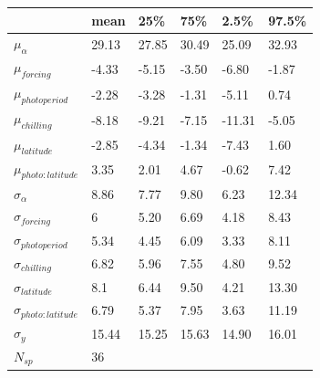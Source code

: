 \documentclass{article}
\begin{document}
\begin{footnotesize}
\begin{table}[ht]
\label{tab:lat}
\begingroup\footnotesize
\begin{tabular}{|p{}|p{}|p{}|p{}|p{}|p{}|}
  \hline
 & mean & 25\% & 75\% & 2.5\% & 97.5\% \\ 
  \hline
$\mu_{\alpha}$ & 29.13 & 27.85 & 30.49 & 25.09 & 32.93 \\ 
  $\mu_{forcing}$ & -4.33 & -5.15 & -3.50 & -6.80 & -1.87 \\ 
  $\mu_{photoperiod}$ & -2.28 & -3.28 & -1.31 & -5.11 & 0.74 \\ 
  $\mu_{chilling}$ & -8.18 & -9.21 & -7.15 & -11.31 & -5.05 \\ 
  $\mu_{latitude}$ & -2.85 & -4.34 & -1.34 & -7.43 & 1.60 \\ 
  $\mu_{photo:latitude}$ & 3.35 & 2.01 & 4.67 & -0.62 & 7.42 \\ 
  $\sigma_{\alpha}$ & 8.86 & 7.77 & 9.80 & 6.23 & 12.34 \\ 
  $\sigma_{forcing}$ & 6 & 5.20 & 6.69 & 4.18 & 8.43 \\ 
  $\sigma_{photoperiod}$ & 5.34 & 4.45 & 6.09 & 3.33 & 8.11 \\ 
  $\sigma_{chilling}$ & 6.82 & 5.96 & 7.55 & 4.80 & 9.52 \\ 
  $\sigma_{latitude}$ & 8.1 & 6.44 & 9.50 & 4.21 & 13.30 \\ 
  $\sigma_{photo:latitude}$ & 6.79 & 5.37 & 7.95 & 3.63 & 11.19 \\ 
  $\sigma_{y}$ & 15.44 & 15.25 & 15.63 & 14.90 & 16.01 \\ 
   \hline
$N_{sp}$ & 36 &  &  &  &  \\ 
   \hline
\end{tabular}
\endgroup
\end{table}


\end{footnotesize}
\end{document}
